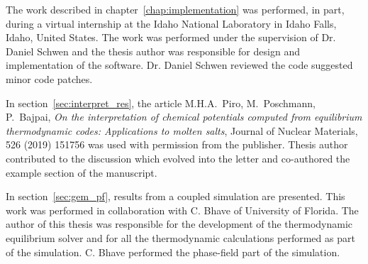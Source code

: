 The work described in chapter~\ref{chap:implementation} was performed, in part, during a virtual internship at the Idaho National Laboratory in Idaho Falls, Idaho, United States. The work was performed under the supervision of Dr. Daniel Schwen and the thesis author was responsible for design and implementation of the software. Dr. Daniel Schwen reviewed the code suggested minor code patches.

In section~\ref{sec:interpret_res}, the article {M.H.A.\ Piro}, {M.\ Poschmann}, {P.\ Bajpai}, \textit{On the interpretation of chemical potentials computed from equilibrium thermodynamic codes: Applications to molten salts}, {Journal of Nuclear Materials, 526 (2019) 151756} was used with permission from the publisher. Thesis author contributed to the discussion which evolved into the letter and co-authored the example section of the manuscript.

In section~\ref{sec:gem_pf}, results from a coupled simulation are presented. This work was performed in collaboration with C. Bhave of University of Florida. The author of this thesis was responsible for the development of the thermodynamic equilibrium solver and for all the thermodynamic calculations performed as part of the simulation. C. Bhave performed the phase-field part of the simulation.